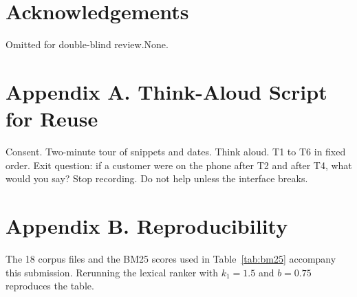 \documentclass{isi2027}
\begin{document}
\section*{Acknowledgements}

\ifisireview Omitted for double-blind review.\else None.\fi

\section*{Appendix A. Think-Aloud Script for Reuse}

Consent. Two-minute tour of snippets and dates. Think aloud. T1 to T6 in fixed order. Exit question: if a customer were on the phone after T2 and after T4, what would you say? Stop recording. Do not help unless the interface breaks.

\section*{Appendix B. Reproducibility}

The 18 corpus files and the BM25 scores used in Table~\ref{tab:bm25} accompany this submission. Rerunning the lexical ranker with $k_1 = 1.5$ and $b = 0.75$ reproduces the table.
\end{document}
